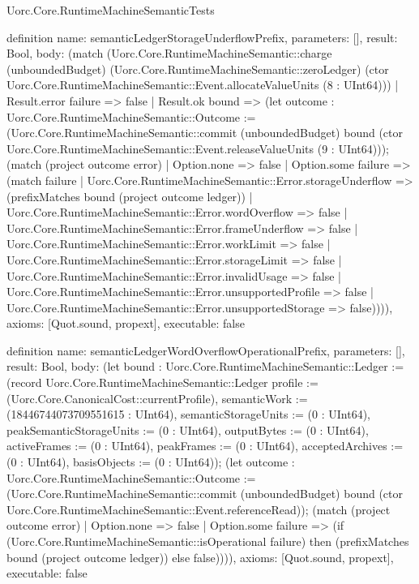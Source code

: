 \begin{lexlean}{Uorc.Core.RuntimeMachineSemanticTests}
\begin{semanticmodule}
definition{
  name: semanticLedgerStorageUnderflowPrefix,
  parameters: [],
  result: Bool,
  body: (match (Uorc.Core.RuntimeMachineSemantic::charge (unboundedBudget) (Uorc.Core.RuntimeMachineSemantic::zeroLedger) (ctor Uorc.Core.RuntimeMachineSemantic::Event.allocateValueUnits (8 : UInt64)))
    | Result.error failure => false
    | Result.ok bound => (let outcome : Uorc.Core.RuntimeMachineSemantic::Outcome := (Uorc.Core.RuntimeMachineSemantic::commit (unboundedBudget) bound (ctor Uorc.Core.RuntimeMachineSemantic::Event.releaseValueUnits (9 : UInt64))); (match (project outcome error)
      | Option.none => false
      | Option.some failure => (match failure
        | Uorc.Core.RuntimeMachineSemantic::Error.storageUnderflow => (prefixMatches bound (project outcome ledger))
        | Uorc.Core.RuntimeMachineSemantic::Error.wordOverflow => false
        | Uorc.Core.RuntimeMachineSemantic::Error.frameUnderflow => false
        | Uorc.Core.RuntimeMachineSemantic::Error.workLimit => false
        | Uorc.Core.RuntimeMachineSemantic::Error.storageLimit => false
        | Uorc.Core.RuntimeMachineSemantic::Error.invalidUsage => false
        | Uorc.Core.RuntimeMachineSemantic::Error.unsupportedProfile => false
        | Uorc.Core.RuntimeMachineSemantic::Error.unsupportedStorage => false)))),
  axioms: [Quot.sound, propext],
  executable: false
}

definition{
  name: semanticLedgerWordOverflowOperationalPrefix,
  parameters: [],
  result: Bool,
  body: (let bound : Uorc.Core.RuntimeMachineSemantic::Ledger := (record Uorc.Core.RuntimeMachineSemantic::Ledger {profile := (Uorc.Core.CanonicalCost::currentProfile), semanticWork := (18446744073709551615 : UInt64), semanticStorageUnits := (0 : UInt64), peakSemanticStorageUnits := (0 : UInt64), outputBytes := (0 : UInt64), activeFrames := (0 : UInt64), peakFrames := (0 : UInt64), acceptedArchives := (0 : UInt64), basisObjects := (0 : UInt64)}); (let outcome : Uorc.Core.RuntimeMachineSemantic::Outcome := (Uorc.Core.RuntimeMachineSemantic::commit (unboundedBudget) bound (ctor Uorc.Core.RuntimeMachineSemantic::Event.referenceRead)); (match (project outcome error)
    | Option.none => false
    | Option.some failure => (if (Uorc.Core.RuntimeMachineSemantic::isOperational failure) then (prefixMatches bound (project outcome ledger)) else false)))),
  axioms: [Quot.sound, propext],
  executable: false
}


\end{semanticmodule}
\end{lexlean}

